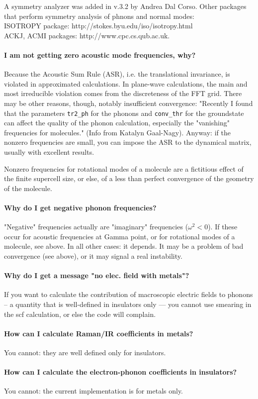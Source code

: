 \documentclass[12pt,a4paper]{article}
\begin{document}
A symmetry analyzer was added in v.3.2 by Andrea Dal Corso. 
Other packages that perform symmetry analysis of phnons and normal modes:\\
ISOTROPY package: http://stokes.byu.edu/iso/isotropy.html\\
ACKJ, ACMI packages: http://www.cpc.cs.qub.ac.uk.

\paragraph{I am not getting zero acoustic mode frequencies, why? }

Because the Acoustic Sum Rule (ASR), i.e. the translational invariance,
is violated in approximated calculations. In plane-wave calculations, 
the main and most irreducible violation comes from the discreteness
of the FFT grid. There may be other reasons, though, notably
insufficient convergence: "Recently I found that the parameters
\texttt{tr2\_ph} for the phonons and \texttt{conv\_thr} for the 
groundstate can affect the quality of the phonon calculation,
 especially the "vanishing" frequencies for molecules."
(Info from Katalyn Gaal-Nagy). Anyway: if the nonzero frequencies are
small, you can impose the ASR to the dynamical matrix, usually with
excellent results.

Nonzero frequencies for rotational modes of a molecule are a fictitious 
effect of the finite supercell size, or else, of a less than perfect
convergence of the geometry of the molecule.

\paragraph{Why do I get negative phonon frequencies? }

"Negative" frequencies actually are "imaginary" frequencies 
($\omega^2<0$). If these occur for acoustic frequencies at Gamma point, 
or for rotational modes of a molecule, see above.
In all other cases: it depends. It may be a problem of bad
convergence (see above), or it may signal a real instability.

\paragraph{Why do I get a message "no elec. field with metals"? }

If you want to calculate the contribution of macroscopic electric 
fields to phonons -- a quantity that is well-defined in insulators 
only --- you cannot use smearing in the scf calculation, or else the
code will complain. 

\paragraph{How can I calculate Raman/IR coefficients in metals?}

You cannot: they are well defined only for insulators.

\paragraph{How can I calculate the electron-phonon coefficients
in insulators?}

You cannot: the current implementation is for metals only.
\end{document}
